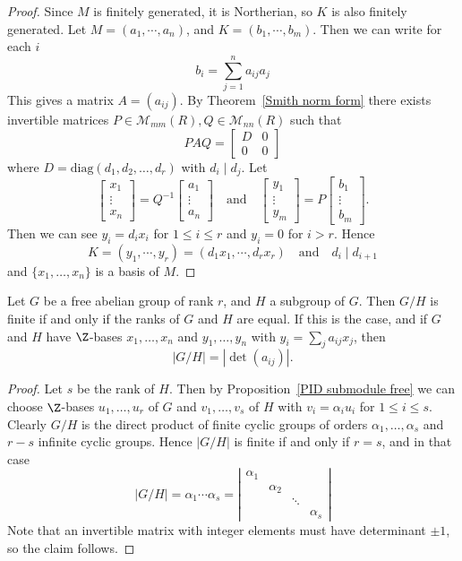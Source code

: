 \begin{proof}
Since $M$ is finitely generated, it is Northerian, so $K$ is also finitely generated. Let $M=(a_1,\cdots,a_n)$, and $K=(b_1,\cdots,b_m)$. Then we can write for each $i$
\[b_i=\sum_{j=1}^{n}a_{ij}a_j\]
This gives a matrix $A=(a_{ij})$. By Theorem~\ref{Smith norm form} there exists invertible matrices $P\in\mathcal{M}_{mm}(R),Q\in\mathcal{M}_{nn}(R)$ such that
\[PAQ=\begin{bmatrix}
D&0\\
0&0
\end{bmatrix}\]
where $D=\mathrm{diag}(d_1,d_2,\dots,d_r)$ with $d_i\mid d_j$. Let 
\[\begin{bmatrix}
x_1\\
\vdots\\
x_n
\end{bmatrix}=Q^{-1}\begin{bmatrix}
a_1\\
\vdots\\
a_n
\end{bmatrix}\quad\text{and}\quad\begin{bmatrix}
y_1\\
\vdots\\
y_m
\end{bmatrix}=P\begin{bmatrix}
b_1\\
\vdots\\
b_m
\end{bmatrix}.\]
Then we can see $y_i=d_ix_i$ for $1\leq i\leq r$ and $y_i=0$ for $i>r$. Hence
\[K=(y_1,\cdots,y_r)=(d_1x_1,\cdots,d_rx_r)\quad\text{and}\quad d_i\mid d_{i+1}\]
and $\{x_1,\dots,x_n\}$ is a basis of $M$.
\end{proof}
\begin{corollary}\label{abelian group quotient order}
Let $G$ be a free abelian group of rank $r$, and $H$ a subgroup of $G$. Then $G/H$ is finite if and only if the ranks of $G$ and $H$ are equal. If this is the case, and if $G$ and $H$ have $\Z$-bases $x_1,\dots,x_n$ and $y_1,\dots,y_n$ with $y_i=\sum_{j}a_{ij}x_j$, then
\[|G/H|=|\det(a_{ij})|.\]
\end{corollary}
\begin{proof}
Let $s$ be the rank of $H$. Then by Proposition~\ref{PID submodule free} we can choose $\Z$-bases $u_1,\dots,u_r$ of $G$ and $v_1,\dots,v_s$ of $H$ with $v_i=\alpha_i u_i$ for $1\leq i\leq s$. Clearly $G/H$ is the direct product of finite cyclic groups of orders $\alpha_1,\dots,\alpha_s$ and $r-s$ infinite cyclic groups. Hence $|G/H|$ is finite if and only if $r=s$, and in that case
\[|G/H|=\alpha_1\cdots\alpha_s=\left|\begin{array}{cccc}
\alpha_1&&&\\
&\alpha_2&&\\
&&\ddots&\\
&&&\alpha_s
\end{array}\right|\]
Note that an invertible matrix with integer elements must have determinant $\pm 1$, so the claim follows.
\end{proof}
